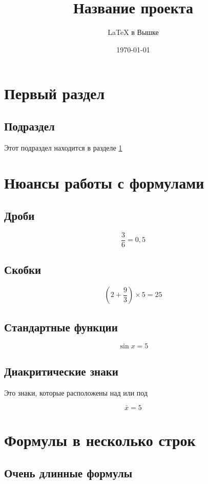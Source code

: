 \documentclass[a4paper, 12pt]{article}
\author{\LaTeX{} в Вышке}
\title{Название проекта}
\date{\today}
\theoremstyle{plain} %
\theoremstyle{definition}	%
\theoremstyle{remark}	%
\begin{document}
	\maketitle
	\tableofcontents
	
	
	\section{Первый раздел} \label{sec:fs}
	\subsection{Подраздел}
	Этот подраздел находится в разделе \ref{sec:fs}
	
	\section{Нюансы работы с формулами}
	
	\subsection{Дроби}
	
	\[\frac{3}{6}=0,5\]
	
	\subsection{Скобки}
	
	\[\left( 2+\frac{9}{3}\right) \times 5=25\]
	
	\subsection{Стандартные функции}
	
	\[\sin x=5\]
	
	\subsection{Диакритические знаки}
	
	Это знаки, которые расположены над или под
	
	\[\bar{x}=5\]
	
	\section{Формулы в несколько строк}
	
	\subsection{Очень длинные формулы}
	
\end{document}
